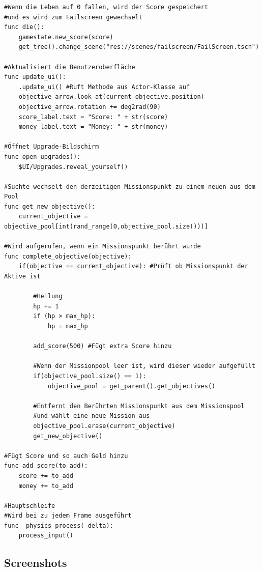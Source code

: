 \documentclass{article}
\begin{document}
\begin{verbatim}
#Wenn die Leben auf 0 fallen, wird der Score gespeichert
#und es wird zum Failscreen gewechselt
func die():
    gamestate.new_score(score)
    get_tree().change_scene("res://scenes/failscreen/FailScreen.tscn")

#Aktualisiert die Benutzeroberfläche
func update_ui():
    .update_ui() #Ruft Methode aus Actor-Klasse auf
    objective_arrow.look_at(current_objective.position)
    objective_arrow.rotation += deg2rad(90)
    score_label.text = "Score: " + str(score)
    money_label.text = "Money: " + str(money)

#Öffnet Upgrade-Bildschirm
func open_upgrades():
    $UI/Upgrades.reveal_yourself()

#Suchte wechselt den derzeitigen Missionspunkt zu einem neuen aus dem Pool
func get_new_objective():
    current_objective = objective_pool[int(rand_range(0,objective_pool.size()))]

#Wird aufgerufen, wenn ein Missionspunkt berührt wurde
func complete_objective(objective):
    if(objective == current_objective): #Prüft ob Missionspunkt der Aktive ist

        #Heilung
        hp += 1
        if (hp > max_hp):
            hp = max_hp
        
        add_score(500) #Fügt extra Score hinzu

        #Wenn der Missionpool leer ist, wird dieser wieder aufgefüllt
        if(objective_pool.size() == 1):
            objective_pool = get_parent().get_objectives()

        #Entfernt den Berührten Missionspunkt aus dem Missionspool 
        #und wählt eine neue Mission aus
        objective_pool.erase(current_objective) 
        get_new_objective()

#Fügt Score und so auch Geld hinzu
func add_score(to_add):
    score += to_add
    money += to_add

#Hauptschleife
#Wird bei zu jedem Frame ausgeführt
func _physics_process(_delta):
    process_input()
	\end{verbatim}
	\newpage
	
	\subsection{Screenshots}
	
\end{document}

